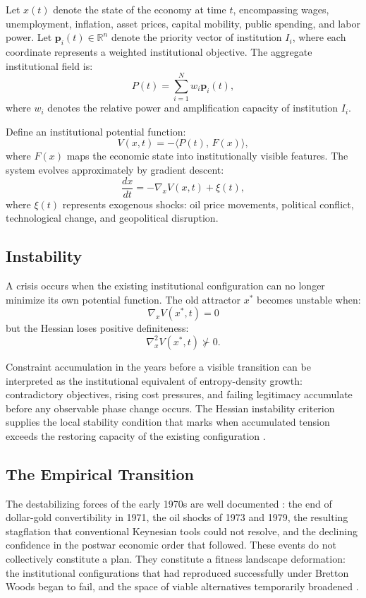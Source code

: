 \documentclass[12pt, a4paper]{article}
\theoremstyle{named}
\begin{document}
Let $x(t)$ denote the state of the economy at time $t$, encompassing
wages, unemployment, inflation, asset prices, capital mobility, public
spending, and labor power. Let $\mathbf{p}_i(t) \in \mathbb{R}^n$
denote the priority vector of institution $I_i$, where each coordinate
represents a weighted institutional objective. The aggregate
institutional field is:
\[
  P(t) = \sum_{i=1}^{N} w_i \mathbf{p}_i(t),
\]
where $w_i$ denotes the relative power and amplification capacity of
institution $I_i$.

Define an institutional potential function:
\[
  V(x,t) = -\langle P(t),\, F(x)\rangle,
\]
where $F(x)$ maps the economic state into institutionally visible
features. The system evolves approximately by gradient descent:
\[
  \frac{dx}{dt} = -\nabla_x V(x,t) + \xi(t),
\]
where $\xi(t)$ represents exogenous shocks: oil price movements,
political conflict, technological change, and geopolitical disruption.

\subsection{Instability}

A crisis occurs when the existing institutional configuration can no
longer minimize its own potential function. The old attractor
$x^{\ast}$ becomes unstable when:
\[
  \nabla_x V(x^{\ast},t) = 0
\]
but the Hessian loses positive definiteness:
\[
  \nabla_x^2 V(x^{\ast},t) \not\succ 0.
\]

Constraint accumulation in the years before a visible transition can be
interpreted as the institutional equivalent of entropy-density growth:
contradictory objectives, rising cost pressures, and failing legitimacy
accumulate before any observable phase change occurs. The Hessian
instability criterion supplies the local stability condition that marks
when accumulated tension exceeds the restoring capacity of the existing
configuration \cite{strogatz2015,turchin2016}.

\subsection{The Empirical Transition}

The destabilizing forces of the early 1970s are well documented
\cite{harvey2005,minsky1986,krippner2011}: the end of dollar-gold
convertibility in 1971, the oil shocks of 1973 and 1979, the resulting
stagflation that conventional Keynesian tools could not resolve, and
the declining confidence in the postwar economic order that followed.
These events do not collectively constitute a plan. They constitute a
fitness landscape deformation: the institutional configurations that had
reproduced successfully under Bretton Woods began to fail, and the space
of viable alternatives temporarily broadened \cite{turchin2016}.
\end{document}

